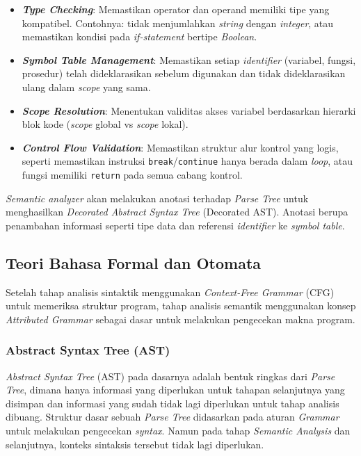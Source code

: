 ﻿\documentclass[12pt,a4paper]{article}
\begin{document}
\begin{itemize}
    \item \textbf{\textit{Type Checking}}: Memastikan operator dan operand memiliki tipe yang kompatibel. Contohnya: tidak menjumlahkan \textit{string} dengan \textit{integer}, atau memastikan kondisi pada \textit{if-statement} bertipe \textit{Boolean}.
    \item \textbf{\textit{Symbol Table Management}}: Memastikan setiap \textit{identifier} (variabel, fungsi, prosedur) telah dideklarasikan sebelum digunakan dan tidak dideklarasikan ulang dalam \textit{scope} yang sama.
    \item \textbf{\textit{Scope Resolution}}: Menentukan validitas akses variabel berdasarkan hierarki blok kode (\textit{scope} global vs \textit{scope} lokal).
    \item \textbf{\textit{Control Flow Validation}}: Memastikan struktur alur kontrol yang logis, seperti memastikan instruksi \texttt{break}/\texttt{continue} hanya berada dalam \textit{loop}, atau fungsi memiliki \texttt{return} pada semua cabang kontrol.
\end{itemize}

\textit{Semantic analyzer} akan melakukan anotasi terhadap \textit{Parse Tree} untuk menghasilkan \textit{Decorated Abstract Syntax Tree} (Decorated AST). Anotasi berupa penambahan informasi seperti tipe data dan referensi \textit{identifier} ke \textit{symbol table}.

\subsection{Teori Bahasa Formal dan Otomata}

Setelah tahap analisis sintaktik menggunakan \textit{Context-Free Grammar} (CFG) untuk memeriksa struktur program, tahap analisis semantik menggunakan konsep \textit{Attributed Grammar} sebagai dasar untuk melakukan pengecekan makna program.

\subsubsection{Abstract Syntax Tree (AST)}

\textit{Abstract Syntax Tree} (AST) pada dasarnya adalah bentuk ringkas dari \textit{Parse Tree}, dimana hanya informasi yang diperlukan untuk tahapan selanjutnya yang disimpan dan informasi yang sudah tidak lagi diperlukan untuk tahap analisis dibuang. Struktur dasar sebuah \textit{Parse Tree} didasarkan pada aturan \textit{Grammar} untuk melakukan pengecekan \textit{syntax}. Namun pada tahap \textit{Semantic Analysis} dan selanjutnya, konteks sintaksis tersebut tidak lagi diperlukan.
\end{document}
